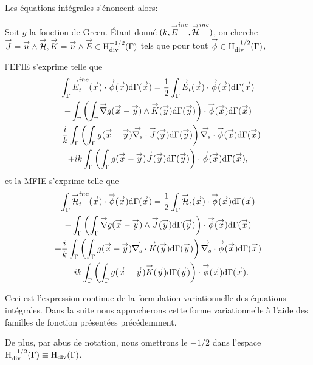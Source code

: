   Les équations intégrales s'énoncent alors:

  Soit \(g\) la fonction de Green. Étant donné \((k,{\overset{\rightarrow}{E}}^{inc},{\overset{\rightarrow}{\mathcal{H}}}^{inc})\), on cherche \({\overset{\rightarrow}{J}} = {\overset{\rightarrow}{n}} \wedge {\overset{\rightarrow}{\mathcal{H}}}, {\overset{\rightarrow}{K}} = {\overset{\rightarrow}{n}} \wedge {\overset{\rightarrow}{E}} \in \mathrm{H}_\mathrm{div}^{-1/2}{(\Gamma)}\)  tels que pour tout \({\overset{\rightarrow}{\phi}} \in \mathrm{H}_\mathrm{div}^{-1/2}(\Gamma)\),

  l'EFIE s'exprime telle que
  \begin{multline}
    \label{eq:form_int:EFIE:var}
    \int_{\Gamma} \vE^{inc}_t(\vx) \cdot \vect{\phi}(\vx) \dd{\Gamma}(\vx) =
      \frac{1}{2} \int_{\Gamma} \vE_t(\vx) \cdot \vect{\phi}(\vx) \dd{\Gamma}(\vx) \\
        - \int_{\Gamma} \left( \int_{\Gamma} \vgrad g(\vx - \vy) \pvect \vK(\vy) \dd{\Gamma}(\vy) \right) \cdot \vect{\phi}(\vx) \dd{\Gamma}(\vx) \\
      - \frac{i}{k} \int_{\Gamma} \left( \int_{\Gamma}  g(\vx - \vy)\vdivs\vJ(\vy) \dd{\Gamma}(\vy) \right)\vdivs \vect{\phi}(\vx) \dd{\Gamma}(\vx) \\
        +  ik\int_{\Gamma} \left( \int_{\Gamma} g(\vx - \vy)\vJ(\vy) \dd{\Gamma}(\vy) \right) \cdot \vect{\phi}(\vx) \dd{\Gamma}(\vx),
  \end{multline}
  et la MFIE s'exprime telle que
  \begin{multline}
    \label{eq:form_int:MFIE:var}
    \int_{\Gamma} \vH^{inc}_t(\vx) \cdot \vect{\phi}(\vx) \dd{\Gamma}(\vx) =
      \frac{1}{2} \int_{\Gamma} \vH_t(\vx) \cdot \vect{\phi}(\vx) \dd{\Gamma}(\vx) \\
        - \int_{\Gamma} \left( \int_{\Gamma} \vgrad g(\vx - \vy) \pvect \vJ(\vy) \dd{\Gamma}(\vy) \right) \cdot \vect{\phi}(\vx) \dd{\Gamma}(\vx) \\
      + \frac{i}{k} \int_{\Gamma} \left( \int_{\Gamma}  g(\vx - \vy)\vdivs\vK(\vy) \dd{\Gamma}(\vy) \right)\vdivs \vect{\phi}(\vx) \dd{\Gamma}(\vx) \\
        -  ik\int_{\Gamma} \left( \int_{\Gamma} g(\vx - \vy)\vK(\vy) \dd{\Gamma}(\vy) \right) \cdot \vect{\phi}(\vx) \dd{\Gamma}(\vx).
  \end{multline}

  Ceci est l'expression continue de la formulation variationnelle des équations intégrales.
  Dans la suite nous approcherons cette forme variationnelle à l'aide des familles de fonction présentées précédemment.

  De plus, par abus de notation, nous omettrons le \(-1/2\) dans l'espace \(\mathrm{H}_\mathrm{div}^{-1/2}(\Gamma)\equiv\mathrm{H}_\mathrm{div}(\Gamma)\).

